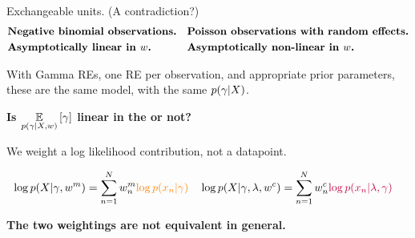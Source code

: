 \begin{frame}[t]{Exchangeable units.  (A contradiction?)}
    \vspace{-1em}
    \begin{align*}
    &\text{\textbf{Negative binomial observations.}}
    &
    &\text{\textbf{Poisson observations with random effects.}}
    \\
    &\text{\textbf{Asymptotically linear in $w$.}}
    &
    &\text{\textbf{Asymptotically non-linear in $w$.}}
    \end{align*}
    \begin{center}
        With Gamma REs, one RE per observation, and appropriate prior parameters,\\
        these are the same model, with the same $p(\gamma \vert X)$.
        
    \textbf{Is $\underset{p(\gamma \vert X, w)}{\mathbb{E}}\left[\gamma\right]$
    linear in the 
    or not?}
    
    \spskip

    \textbf{}  We weight a log likelihood
    contribution, not a datapoint.

    \begin{align*}
        &\log p(X \vert \gamma, w^{m}) =
            \sum_{n=1}^N w^{m}_n 
            \textcolor{orange}{\log p(x_n \vert \gamma)}
        &
        &\log p(X \vert \gamma, \lambda, w^{c}) =
            \sum_{n=1}^N w^{c}_n 
            \textcolor{purple}{\log p(x_n \vert \lambda, \gamma)}
    \end{align*}
        

    \textbf{The two weightings are not equivalent in general.}

    
    \end{center}
\end{frame}


